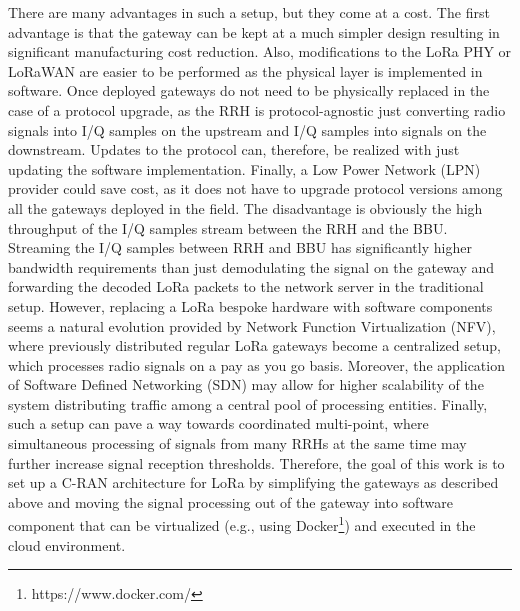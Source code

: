 There are many advantages in such a setup, but they come at a cost. 
The first advantage is that the gateway can be kept at a much simpler design resulting in significant manufacturing cost reduction. 
Also, modifications to the LoRa PHY or LoRaWAN are easier to be performed as the physical layer is implemented in software. 
Once deployed gateways do not need to be physically replaced in the case of a protocol upgrade, as the RRH is protocol-agnostic just converting radio signals into I/Q samples on the upstream and I/Q samples into signals on the downstream.
Updates to the protocol can, therefore, be realized with just updating the software implementation. 
Finally, a Low Power Network (LPN) provider could save cost, as it does not have to upgrade protocol versions among all the gateways deployed in the field.
The disadvantage is obviously the high throughput of the I/Q samples stream between the RRH and the BBU. 
Streaming the I/Q samples between RRH and BBU has significantly higher bandwidth requirements than just demodulating the signal on the gateway and forwarding the decoded LoRa packets to the network server in the traditional setup. 
However, replacing a LoRa bespoke hardware with software components seems a natural evolution provided by Network Function Virtualization (NFV), where previously distributed regular LoRa gateways become a centralized setup, which processes radio signals on a pay as you go basis. Moreover, the application of Software Defined Networking (SDN) may allow for higher scalability of the system distributing traffic among a central pool of processing entities. Finally, such a setup can pave a way towards coordinated multi-point, where simultaneous processing of signals from many RRHs at the same time may further increase signal reception thresholds.
Therefore, the goal of this work is to set up a C-RAN architecture for LoRa by simplifying the gateways as described above and moving the signal processing out of the gateway into software component that can be virtualized (e.g., using Docker\footnote{https://www.docker.com/}) and executed in the cloud environment. 


